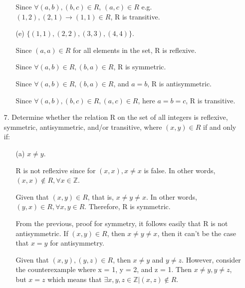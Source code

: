 \documentclass[12pt]{article}
\newcommand\bufsub{\vspace{1.0in}}
\newenvironment{answer}{\larger[2]}{}
\begin{document}
\begin{enumerate}
\begin{enumerate}
\begin{answer}
        Since $\forall (a, b), (b, c) \in R$, $(a, c) \in R$ e.g. $(1, 2), (2, 1) \to (1, 1) \in R$, R is transitive.
    \end{answer}

    \vspace{0.2in}
    
    \item[(e)] $\{ (1,1), (2,2), (3,3), (4,4) \}$.
    
    \begin{answer}
        Since $(a, a) \in R$ for all elements in the set, R is reflexive.

        Since $\forall (a, b) \in R, (b, a) \in R$, R is symmetric.

        Since $\forall (a, b) \in R, (b, a) \in R$, and $a = b$, R is antisymmetric.

        Since $\forall (a, b), (b, c) \in R, (a, c) \in R$, here $a = b = c$, R is transitive.
    \end{answer}
    
\end{enumerate}

\bufsub



\item[7.] Determine whether the relation R on the set of all integers is reflexive, symmetric, antisymmetric, and/or transitive, where $(x,y) \in R$ if and only if:
%
\begin{enumerate}

\item[(a)] $x \neq y$.

\begin{answer}
    R is not reflexive since for $(x, x), x \neq x$ is false. In other words, $(x, x) \notin R, \forall x \in \mathbb{Z}$.

    Given that $(x, y) \in R$, that is, $x \neq y \neq x$. In other words, $(y, x) \in R, \forall x, y \in R$. Therefore, R is symmetric.

    From the previous, proof for symmetry, it follows easily that R is not antisymmetric. If $(x, y) \in R$, then $x \neq y \neq x$, then it can't be the case that $x = y$ for antisymmetry.

    Given that $(x, y), (y, z) \in R$, then $x \neq y$ and $y \neq z$. However, consider the counterexample where x = 1, y = 2, and z = 1. Then $x \neq y, y \neq z$, but $x = z$ which means that $\exists x, y, z \in \mathbb{Z} | (x, z) \notin R$.


\end{answer}
\end{enumerate}
\end{enumerate}
\end{document}
